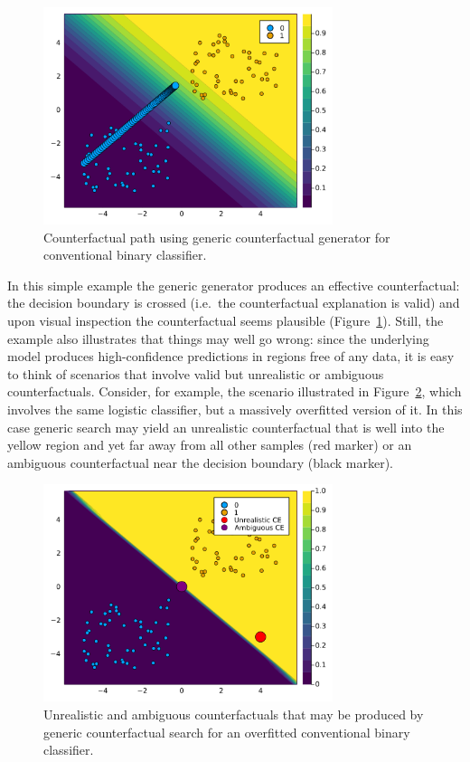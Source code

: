 \documentclass[
  letterpaper,
  DIV=11,
  numbers=noendperiod]{scrartcl}
\begin{document}
\begin{figure}

{\centering \includegraphics[width=3.33333in,height=2.5in]{www/ce_binary.png}

}

\caption{\label{fig-binary}Counterfactual path using generic
counterfactual generator for conventional binary classifier.}

\end{figure}

In this simple example the generic generator produces an effective
counterfactual: the decision boundary is crossed (i.e.~the
counterfactual explanation is valid) and upon visual inspection the
counterfactual seems plausible (Figure~\ref{fig-binary}). Still, the
example also illustrates that things may well go wrong: since the
underlying model produces high-confidence predictions in regions free of
any data, it is easy to think of scenarios that involve valid but
unrealistic or ambiguous counterfactuals. Consider, for example, the
scenario illustrated in Figure~\ref{fig-binary-wrong}, which involves
the same logistic classifier, but a massively overfitted version of it.
In this case generic search may yield an unrealistic counterfactual that
is well into the yellow region and yet far away from all other samples
(red marker) or an ambiguous counterfactual near the decision boundary
(black marker).

\begin{figure}

{\centering \includegraphics[width=3.33333in,height=2.5in]{www/binary_wrong.png}

}

\caption{\label{fig-binary-wrong}Unrealistic and ambiguous
counterfactuals that may be produced by generic counterfactual search
for an overfitted conventional binary classifier.}

\end{figure}
\end{document}
